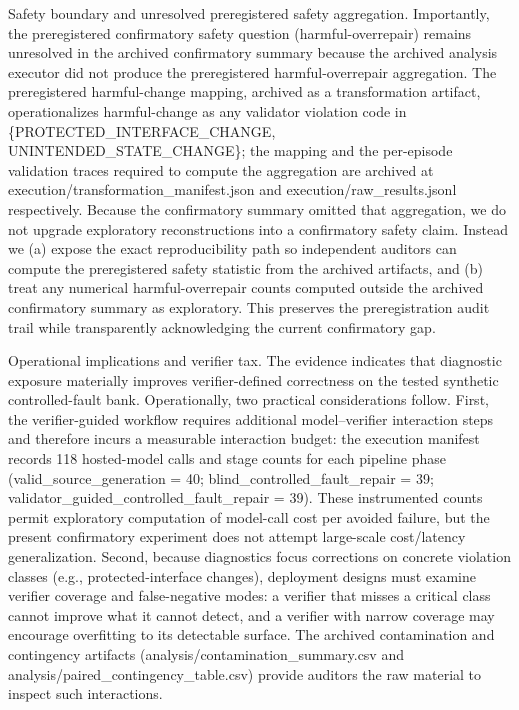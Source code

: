 \documentclass[conference]{IEEEtran}
\begin{document}
Safety boundary and unresolved preregistered safety aggregation. Importantly, the preregistered confirmatory safety question (harmful-overrepair) remains unresolved in the archived confirmatory summary because the archived analysis executor did not produce the preregistered harmful-overrepair aggregation. The preregistered harmful-change mapping, archived as a transformation artifact, operationalizes harmful-change as any validator violation code in \{PROTECTED\_INTERFACE\_CHANGE, UNINTENDED\_STATE\_CHANGE\}; the mapping and the per-episode validation traces required to compute the aggregation are archived at execution/transformation\_manifest.json and execution/raw\_results.jsonl respectively. Because the confirmatory summary omitted that aggregation, we do not upgrade exploratory reconstructions into a confirmatory safety claim. Instead we (a) expose the exact reproducibility path so independent auditors can compute the preregistered safety statistic from the archived artifacts, and (b) treat any numerical harmful-overrepair counts computed outside the archived confirmatory summary as exploratory. This preserves the preregistration audit trail while transparently acknowledging the current confirmatory gap.

Operational implications and verifier tax. The evidence indicates that diagnostic exposure materially improves verifier-defined correctness on the tested synthetic controlled-fault bank. Operationally, two practical considerations follow. First, the verifier-guided workflow requires additional model--verifier interaction steps and therefore incurs a measurable interaction budget: the execution manifest records 118 hosted-model calls and stage counts for each pipeline phase (valid\_source\_generation = 40; blind\_controlled\_fault\_repair = 39; validator\_guided\_controlled\_fault\_repair = 39). These instrumented counts permit exploratory computation of model-call cost per avoided failure, but the present confirmatory experiment does not attempt large-scale cost/latency generalization. Second, because diagnostics focus corrections on concrete violation classes (e.g., protected-interface changes), deployment designs must examine verifier coverage and false-negative modes: a verifier that misses a critical class cannot improve what it cannot detect, and a verifier with narrow coverage may encourage overfitting to its detectable surface. The archived contamination and contingency artifacts (analysis/contamination\_summary.csv and analysis/paired\_contingency\_table.csv) provide auditors the raw material to inspect such interactions.
\end{document}
